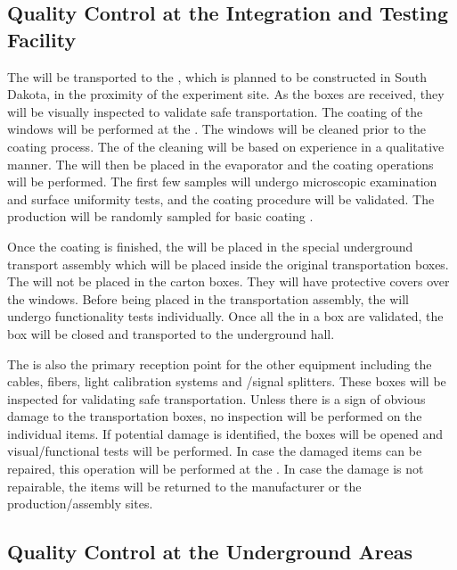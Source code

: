\subsection{Quality Control at the Integration and Testing Facility}

The  will be transported to the , which is planned to be constructed in South Dakota, in the proximity of the experiment site. As the  boxes are received, they will be visually inspected to validate safe transportation. The  coating of the  windows will be performed at the . The  windows will be cleaned prior to the coating process. The  of the cleaning will be based on experience in a qualitative manner. The  will then be placed in the evaporator and the coating operations will be performed. The first few samples will undergo microscopic examination and surface uniformity tests, and the coating procedure will be validated. The production  will be randomly sampled for basic coating .

Once the coating is finished, the  will be placed in the special underground transport assembly which will be placed inside the original transportation boxes. The  will not be placed in the carton boxes. They will have protective covers over the windows. Before being placed in the transportation assembly, the  will undergo functionality tests individually. Once all the  in a box are validated, the box will be closed and transported to the underground hall.

The  is also the primary reception point for the other   equipment including the cables, fibers, light calibration systems and /signal splitters. These boxes will be inspected for validating safe transportation. Unless there is a sign of obvious damage to the transportation boxes, no  inspection will be performed on the individual items. If potential damage is identified, the boxes will be opened and visual/functional  tests will be performed. In case the damaged items can be repaired, this operation will be performed at the . In case the damage is not repairable, the items will be returned to the manufacturer or the production/assembly sites.

\subsection{Quality Control at the Underground Areas}

